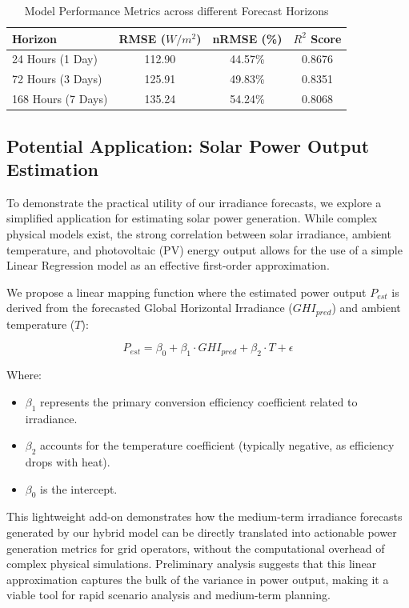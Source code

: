 \documentclass{article}
\begin{document}
\begin{table}[h]
    \centering
    \begin{tabular}{lccc}
        \toprule
        \textbf{Horizon} & \textbf{RMSE ($W/m^2$)} & \textbf{nRMSE (\%)} & \textbf{$R^2$ Score} \\
        \midrule
        24 Hours (1 Day) & 112.90 & 44.57\% & 0.8676 \\
        72 Hours (3 Days) & 125.91 & 49.83\% & 0.8351 \\
        168 Hours (7 Days) & 135.24 & 54.24\% & 0.8068 \\
        \bottomrule
    \end{tabular}
    \caption{Model Performance Metrics across different Forecast Horizons}
\end{table}

\subsection{Potential Application: Solar Power Output Estimation}
To demonstrate the practical utility of our irradiance forecasts, we explore a simplified application for estimating solar power generation. While complex physical models exist, the strong correlation between solar irradiance, ambient temperature, and photovoltaic (PV) energy output allows for the use of a simple Linear Regression model as an effective first-order approximation.

We propose a linear mapping function where the estimated power output $P_{est}$ is derived from the forecasted Global Horizontal Irradiance ($GHI_{pred}$) and ambient temperature ($T$):

\begin{equation}
    P_{est} = \beta_0 + \beta_1 \cdot GHI_{pred} + \beta_2 \cdot T + \epsilon
\end{equation}

Where:
\begin{itemize}
    \item $\beta_1$ represents the primary conversion efficiency coefficient related to irradiance.
    \item $\beta_2$ accounts for the temperature coefficient (typically negative, as efficiency drops with heat).
    \item $\beta_0$ is the intercept.
\end{itemize}

This lightweight add-on demonstrates how the medium-term irradiance forecasts generated by our hybrid model can be directly translated into actionable power generation metrics for grid operators, without the computational overhead of complex physical simulations. Preliminary analysis suggests that this linear approximation captures the bulk of the variance in power output, making it a viable tool for rapid scenario analysis and medium-term planning.
\end{document}
